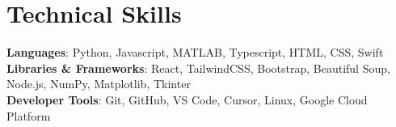 \section{Technical Skills}
\begin{itemize}[leftmargin=0.15in, label={}]
    \small{\item{
        \textbf{Languages}{: Python, Javascript, MATLAB, Typescript, HTML, CSS, Swift} \\
        \textbf{Libraries \& Frameworks}{: React, TailwindCSS, Bootstrap, Beautiful Soup, Node.js, NumPy, Matplotlib, Tkinter} \\
        \textbf{Developer Tools}{: Git, GitHub, VS Code, Cursor, Linux, Google Cloud Platform}
    }}
\end{itemize}
